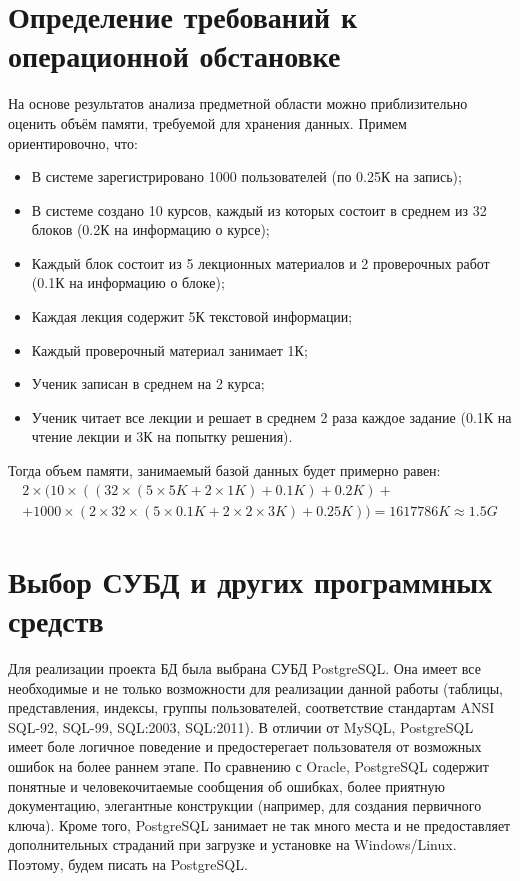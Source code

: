 \documentclass[a4paper,14pt]{article}
\begin{document}
\section{Определение требований к операционной обстановке}
На основе результатов анализа предметной области можно приблизительно оценить объём памяти, требуемой для хранения данных.
Примем ориентировочно, что:
\begin{itemize}
	\item В системе зарегистрировано 1000 пользователей (по 0.25К на запись);
	\item В системе создано 10 курсов, каждый из которых состоит в среднем из 32 блоков (0.2К на информацию о курсе);
	\item Каждый блок состоит из 5 лекционных материалов и 2 проверочных работ (0.1К на информацию о блоке);
	\item Каждая лекция содержит 5К текстовой информации;
	\item Каждый проверочный материал занимает 1К;
	\item Ученик записан в среднем на 2 курса;
	\item Ученик читает все лекции и решает в среднем 2 раза каждое задание (0.1К на чтение лекции и 3К на попытку решения).
\end{itemize}

Тогда объем памяти, занимаемый базой данных будет примерно равен:
\begin{multline*}
2 \times( 10 \times ((32 \times (5 \times 5K + 2 \times 1K) + 0.1K) + 0.2K) + \\ 
+ 1000 \times (2 \times 32 \times (5 \times 0.1K + 2 \times 2 \times 3K) + 0.25K)) = 1617786K	\approx 1.5G
\end{multline*}

\section{Выбор СУБД и других программных средств}
Для реализации проекта БД была выбрана СУБД PostgreSQL.
Она имеет все необходимые и не только возможности для реализации данной работы (таблицы, представления, индексы, группы пользователей, соответствие стандартам ANSI SQL-92, SQL-99, SQL:2003, SQL:2011).
В отличии от MySQL, PostgreSQL имеет боле логичное поведение и предостерегает пользователя от возможных ошибок на более раннем этапе.
По сравнению с Oracle, PostgreSQL содержит понятные и человекочитаемые сообщения об ошибках, более приятную документацию, элегантные конструкции (например, для создания первичного ключа).
Кроме того, PostgreSQL занимает не так много места и не предоставляет дополнительных страданий при загрузке и установке на Windows/Linux.
Поэтому, будем писать на PostgreSQL.
\end{document}

